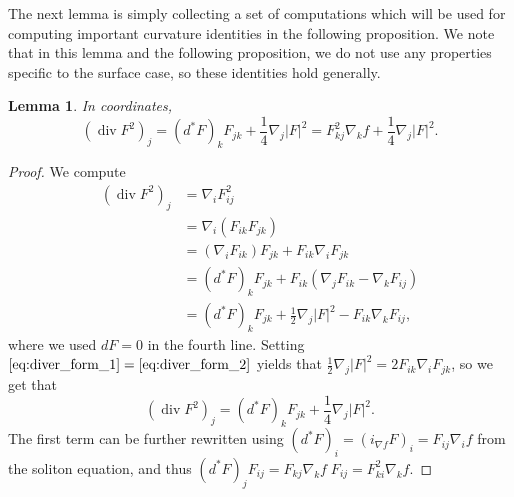 \documentclass[12pt, a4paper, reqno, oneside]{amsart}
\DeclareMathOperator{\diver}{div}
\numberwithin{equation}{section}
\theoremstyle{plain}
\newtheorem{lemma}[theorem]{Lemma}
\theoremstyle{definition}
\theoremstyle{plain}
\begin{document}
The next lemma is simply collecting a set of computations which will be used for computing important curvature identities in the following proposition. We note that in this lemma and the following proposition, we do not use any properties specific to the surface case, so these identities hold generally.

\begin{lemma}\label{diverFsq_identity}
  In coordinates,
  \[
    (\diver F^{2})_{j} = (d^{*}F)_{k}F_{jk}+\frac{1}{4}\nabla_{j}|F|^{2} = F^{2}_{kj}\nabla_{k}f+\frac{1}{4}\nabla_{j}|F|^{2}.
  \]
\end{lemma}
\begin{proof}
  We compute 
  \begin{align}
    (\diver F^{2})_{j} &= \nabla_{i} F_{ij}^{2} \nonumber\\
      &= \nabla_{i}(F_{ik}F_{jk}) \nonumber\\
      &= (\nabla_{i}F_{ik})F_{jk}+F_{ik}\nabla_{i}F_{jk} \label{eq:diver_form_1}\\
      &= (d^{*}F)_{k}F_{jk}+F_{ik}\left(\nabla_{j}F_{ik}-\nabla_{k}F_{ij}\right) \\
      &= (d^{*}F)_{k}F_{jk}+\frac{1}{2}\nabla_{j}|F|^{2}-F_{ik}\nabla_{k}F_{ij} \label{eq:diver_form_2},
  \end{align}
  where we used $dF=0$ in the fourth line.
  Setting $\eqref{eq:diver_form_1}=\eqref{eq:diver_form_2}$ yields that $\frac{1}{2}\nabla_{j}|F|^{2}=2F_{ik}\nabla_{i}F_{jk}$, so we get that
  \[
    (\diver F^{2})_{j} = (d^{*}F)_{k}F_{jk}+\frac{1}{4}\nabla_{j}|F|^{2}.
  \]
  The first term can be further rewritten using $\left(d^{*}F\right)_{i}=(i_{\nabla f}F)_{i} = F_{ij}\nabla_{i}f$ from the soliton equation, and thus  $(d^{*}F)_{j}F_{ij} = F_{kj}\nabla_{k}f\;F_{ij} = F^{2}_{ki}\nabla_{k}f$.
\end{proof}
\end{document}
